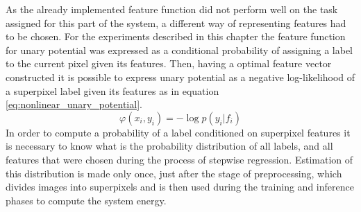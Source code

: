 As the already implemented feature function did not perform well on the task assigned for this part of the system, a different way of representing features had to be chosen. For the experiments described in this chapter the feature function for unary potential was expressed as a conditional probability of assigning a label to the current pixel given its features. Then, having a optimal feature vector constructed it is possible to express unary potential as a negative log-likelihood of a superpixel label given its features as in equation \ref{eq:nonlinear_unary_potential}. 
\begin{equation}
    \label{eq:nonlinear_unary_potential}
    \varphi(x_i,y_i) = -\log p(y_i|f_i)
\end{equation}
In order to compute a probability of a label conditioned on superpixel features it is necessary to know what is the probability distribution of all labels, and all features that were chosen during the process of stepwise regression. Estimation of this distribution is made only once, just after the stage of preprocessing, which divides images into superpixels and is then used during the training and inference phases to compute the system energy. 



